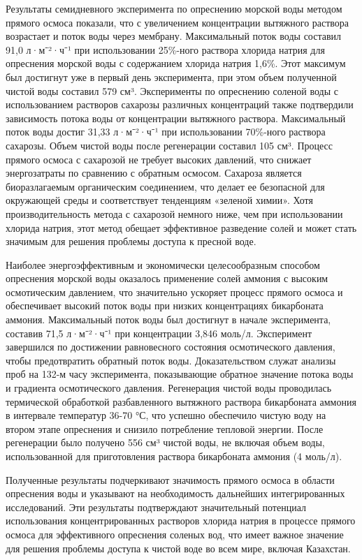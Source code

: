 \begin{multicols}{2}
Результаты семидневного эксперимента по опреснению морской воды методом
прямого осмоса показали, что с увеличением концентрации вытяжного
раствора возрастает и поток воды через мембрану. Максимальный поток воды
составил 91,0 л·м⁻²·ч⁻¹ при использовании 25\%-ного раствора хлорида
натрия для опреснения морской воды с содержанием хлорида натрия 1,6\%.
Этот максимум был достигнут уже в первый день эксперимента, при этом
объем полученной чистой воды составил 579 см³. Эксперименты по
опреснению соленой воды с использованием растворов сахарозы различных
концентраций также подтвердили зависимость потока воды от концентрации
вытяжного раствора. Максимальный поток воды достиг 31,33 л·м⁻²·ч⁻¹ при
использовании 70\%-ного раствора сахарозы. Объем чистой воды после
регенерации составил 105 см³. Процесс прямого осмоса с сахарозой не
требует высоких давлений, что снижает энергозатраты по сравнению с
обратным осмосом. Сахароза является биоразлагаемым органическим
соединением, что делает ее безопасной для окружающей среды и
соответствует тенденциям «зеленой химии». Хотя производительность метода
с сахарозой немного ниже, чем при использовании хлорида натрия, этот
метод обещает эффективное разведение солей и может стать значимым для
решения проблемы доступа к пресной воде.

Наиболее энергоэффективным и экономически целесообразным способом
опреснения морской воды оказалось применение солей аммония с высоким
осмотическим давлением, что значительно ускоряет процесс прямого осмоса
и обеспечивает высокий поток воды при низких концентрациях бикарбоната
аммония. Максимальный поток воды был достигнут в начале эксперимента,
составив 71,5 л·м⁻²·ч⁻¹ при концентрации 3,846 моль/л. Эксперимент
завершился по достижении равновесного состояния осмотического давления,
чтобы предотвратить обратный поток воды. Доказательством служат анализы
проб на 132-м часу эксперимента, показывающие обратное значение потока
воды и градиента осмотического давления. Регенерация чистой воды
проводилась термической обработкой разбавленного вытяжного раствора
бикарбоната аммония в интервале температур 36-70 °С, что успешно
обеспечило чистую воду на втором этапе опреснения и снизило потребление
тепловой энергии. После регенерации было получено 556 см³ чистой воды,
не включая объем воды, использованной для приготовления раствора
бикарбоната аммония (4 моль/л).

Полученные результаты подчеркивают значимость прямого осмоса в области
опреснения воды и указывают на необходимость дальнейших интегрированных
исследований. Эти результаты подтверждают значительный потенциал
использования концентрированных растворов хлорида натрия в процессе
прямого осмоса для эффективного опреснения соленых вод, что имеет важное
значение для решения проблемы доступа к чистой воде во всем мире,
включая Казахстан.
\end{multicols}

